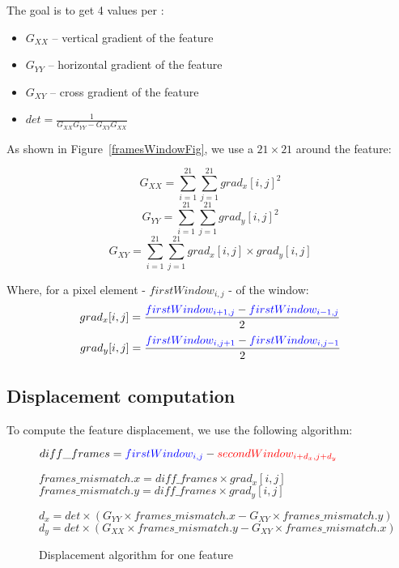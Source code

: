 The goal is to get 4 values per \feat{}:
\begin{itemize}
	\item $G_{XX}$ -- vertical gradient of the feature
	\item $G_{YY}$ -- horizontal gradient of the feature
	\item $G_{XY}$ -- cross gradient of the feature
	\item $det = \frac{1}{G_{XX}G_{YY}-G_{XY}G_{XX}}$
\end{itemize}

As shown in Figure~\ref{framesWindowFig}, we use a $21\times21$  around the feature:

$$G_{XX} = \sum_{i=1}^{21}\sum_{j=1}^{21} grad_{x}[i,j]^{2}$$
$$G_{YY} = \sum_{i=1}^{21}\sum_{j=1}^{21} grad_{y}[i,j]^{2}$$
$$G_{XY} = \sum_{i=1}^{21}\sum_{j=1}^{21} grad_{x}[i,j]\times grad_{y}[i,j]$$

Where, for a pixel element - $firstWindow_{i,j}$ -  of the window:
$$grad_{x}[i,j] = \frac{\textcolor{blue}{firstWindow_{i+1,j}} - \textcolor{blue}{firstWindow_{i-1,j}}}{2}$$
$$grad_{y}[i,j] = \frac{\textcolor{blue}{firstWindow_{i,j+1}} - \textcolor{blue}{firstWindow_{i,j-1}}}{2}$$


\subsection{Displacement computation}\label{dispComp}

To compute the feature displacement, we use the following algorithm:

\begin{figure}[!htbp]
\begin{algorithmic}

	\State $diff\_frames = \textcolor{blue}{firstWindow_{i,j}} - \textcolor{red}{secondWindow_{i+d_{x},j+d_{y}}}$

	\State $frames\_mismatch.x = diff\_frames\times grad_{x}[i,j]$
	\State $frames\_mismatch.y = diff\_frames\times grad_{y}[i,j]$

	\EndFor

	\State $d_{x} = det\times (G_{YY}\times frames\_mismatch.x - G_{XY}\times frames\_mismatch.y)$
	\State $d_{y} = det\times (G_{XX}\times frames\_mismatch.y - G_{XY}\times frames\_mismatch.x)$
\end{algorithmic}
\caption{Displacement algorithm for one feature}
\label{algoFig}
\end{figure}
\FloatBarrier


